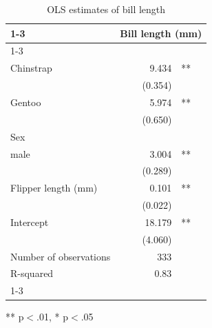 \begin{table}[!h]
\caption{OLS estimates of bill length}
\centering
\begin{tabular}{lll}
\cline{1-3}
\multicolumn{1}{r}{} &
  \multicolumn{2}{c}{Bill length (mm)} \\
\cline{1-3}
\multicolumn{1}{l}{Species} &
  \multicolumn{1}{r}{} &
  \multicolumn{1}{l}{} \\
\multicolumn{1}{l}{\hspace{1em}Chinstrap} &
  \multicolumn{1}{r}{9.434} &
  \multicolumn{1}{l}{**} \\
\multicolumn{1}{l}{} &
  \multicolumn{1}{r}{(0.354)} &
  \multicolumn{1}{l}{} \\
\multicolumn{1}{l}{\hspace{1em}Gentoo} &
  \multicolumn{1}{r}{5.974} &
  \multicolumn{1}{l}{**} \\
\multicolumn{1}{l}{} &
  \multicolumn{1}{r}{(0.650)} &
  \multicolumn{1}{l}{} \\
\multicolumn{1}{l}{Sex} &
  \multicolumn{1}{r}{} &
  \multicolumn{1}{l}{} \\
\multicolumn{1}{l}{\hspace{1em}male} &
  \multicolumn{1}{r}{3.004} &
  \multicolumn{1}{l}{**} \\
\multicolumn{1}{l}{} &
  \multicolumn{1}{r}{(0.289)} &
  \multicolumn{1}{l}{} \\
\multicolumn{1}{l}{Flipper length (mm)} &
  \multicolumn{1}{r}{0.101} &
  \multicolumn{1}{l}{**} \\
\multicolumn{1}{l}{} &
  \multicolumn{1}{r}{(0.022)} &
  \multicolumn{1}{l}{} \\
\multicolumn{1}{l}{Intercept} &
  \multicolumn{1}{r}{18.179} &
  \multicolumn{1}{l}{**} \\
\multicolumn{1}{l}{} &
  \multicolumn{1}{r}{(4.060)} &
  \multicolumn{1}{l}{} \\
\multicolumn{1}{l}{Number of observations} &
  \multicolumn{1}{r}{333} &
  \multicolumn{1}{l}{} \\
\multicolumn{1}{l}{R-squared} &
  \multicolumn{1}{r}{0.83} &
  \multicolumn{1}{l}{} \\
\cline{1-3}
\end{tabular}

\footnotesize{
** p$<$.01, * p$<$.05
}
\end{table}
